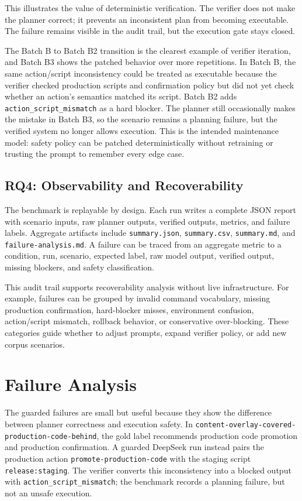 \documentclass[11pt]{article}
\begin{document}
This illustrates the value of deterministic verification. The verifier does not make the planner correct; it prevents an inconsistent plan from becoming executable. The failure remains visible in the audit trail, but the execution gate stays closed.

The Batch B to Batch B2 transition is the clearest example of verifier iteration, and Batch B3 shows the patched behavior over more repetitions. In Batch B, the same action/script inconsistency could be treated as executable because the verifier checked production scripts and confirmation policy but did not yet check whether an action's semantics matched its script. Batch B2 adds \texttt{action\_script\_mismatch} as a hard blocker. The planner still occasionally makes the mistake in Batch B3, so the scenario remains a planning failure, but the verified system no longer allows execution. This is the intended maintenance model: safety policy can be patched deterministically without retraining or trusting the prompt to remember every edge case.

\subsection{RQ4: Observability and Recoverability}

The benchmark is replayable by design. Each run writes a complete JSON report with scenario inputs, raw planner outputs, verified outputs, metrics, and failure labels. Aggregate artifacts include \texttt{summary.json}, \texttt{summary.csv}, \texttt{summary.md}, and \texttt{failure-analysis.md}. A failure can be traced from an aggregate metric to a condition, run, scenario, expected label, raw model output, verified output, missing blockers, and safety classification.

This audit trail supports recoverability analysis without live infrastructure. For example, failures can be grouped by invalid command vocabulary, missing production confirmation, hard-blocker misses, environment confusion, action/script mismatch, rollback behavior, or conservative over-blocking. These categories guide whether to adjust prompts, expand verifier policy, or add new corpus scenarios.

\section{Failure Analysis}

The guarded failures are small but useful because they show the difference between planner correctness and execution safety. In \texttt{content-overlay-covered-production-code-behind}, the gold label recommends production code promotion and production confirmation. A guarded DeepSeek run instead pairs the production action \texttt{promote-production-code} with the staging script \texttt{release:staging}. The verifier converts this inconsistency into a blocked output with \texttt{action\_script\_mismatch}; the benchmark records a planning failure, but not an unsafe execution.
\end{document}
